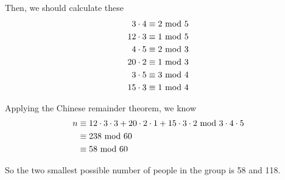 \documentclass{article}
\renewcommand{\mod}{{\rm\ mod\ }}
\begin{document}
Then, we should calculate these
\begin{align*}
3\cdot4&\equiv 2\mod5\\
12\cdot3&\equiv 1\mod5\\
4\cdot5&\equiv 2\mod3\\
20\cdot2&\equiv 1\mod3\\
3\cdot5&\equiv 3\mod4\\
15\cdot3&\equiv 1\mod4
\end{align*}

Applying the Chinese remainder theorem, we know
\begin{align*}
n&\equiv 12\cdot3\cdot3+20\cdot2\cdot1+15\cdot3\cdot2 \mod 3\cdot4\cdot5\\
&\equiv 238 \mod 60\\
&\equiv 58 \mod 60
\end{align*}

So the two smallest possible number of people in the group is 58 and 118.
\end{document}
